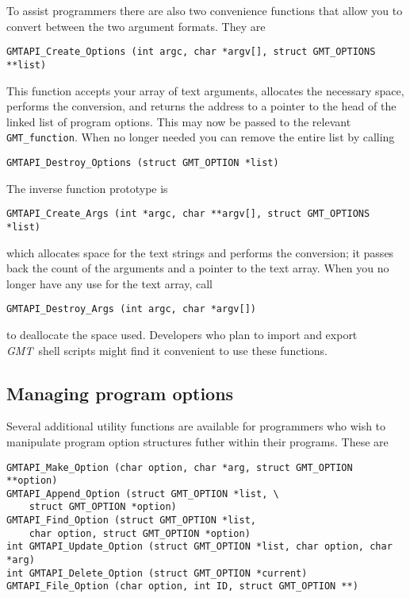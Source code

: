 \documentclass{report}
\newcommand{\GMT}{\textit{GMT}}%
\newcommand{\GMT}{\htmladdnormallink{\texttt{[image: eps/GMT\_glyph10.eps]}}{http://gmt.soest.hawaii.edu}}%
\newcommand{\GMT}{\htmladdnormallink{\textbf{GMT}}{http://gmt.soest.hawaii.edu}}%
\begin{document}
To assist programmers there are also two convenience functions that
allow you to convert between the two argument formats.  They are

\begin{verbatim}
GMTAPI_Create_Options (int argc, char *argv[], struct GMT_OPTIONS **list)
\end{verbatim}
This function accepts your array of text arguments, allocates the necessary space, performs the conversion,
and returns the address to a pointer to the head of the linked list of program options.  This may now be passed to the
relevant \texttt{GMT\_function}.  When no longer needed you can remove the entire
list by calling
\begin{verbatim}
GMTAPI_Destroy_Options (struct GMT_OPTION *list)
\end{verbatim}
The inverse function prototype is
\begin{verbatim}
GMTAPI_Create_Args (int *argc, char **argv[], struct GMT_OPTIONS *list)
\end{verbatim}
which allocates space for the text strings and performs the conversion;
it passes back the count of the arguments and a pointer to the text array.
When you no longer have any use for the text array, call
\begin{verbatim}
GMTAPI_Destroy_Args (int argc, char *argv[])
\end{verbatim}
to deallocate the space used.
Developers who plan to import and export \GMT\ shell scripts might find it convenient to use these functions.

\subsection{Managing program options}
\index{GMT@\GMT!Managing program options}

Several additional utility functions are available for programmers who wish to manipulate
program option structures futher within their programs. These are 

\begin{verbatim}
GMTAPI_Make_Option (char option, char *arg, struct GMT_OPTION **option)
GMTAPI_Append_Option (struct GMT_OPTION *list, \
    struct GMT_OPTION *option)
GMTAPI_Find_Option (struct GMT_OPTION *list, 
    char option, struct GMT_OPTION *option)
int GMTAPI_Update_Option (struct GMT_OPTION *list, char option, char *arg)
int GMTAPI_Delete_Option (struct GMT_OPTION *current)
GMTAPI_File_Option (char option, int ID, struct GMT_OPTION **)
\end{verbatim}
\end{document}
